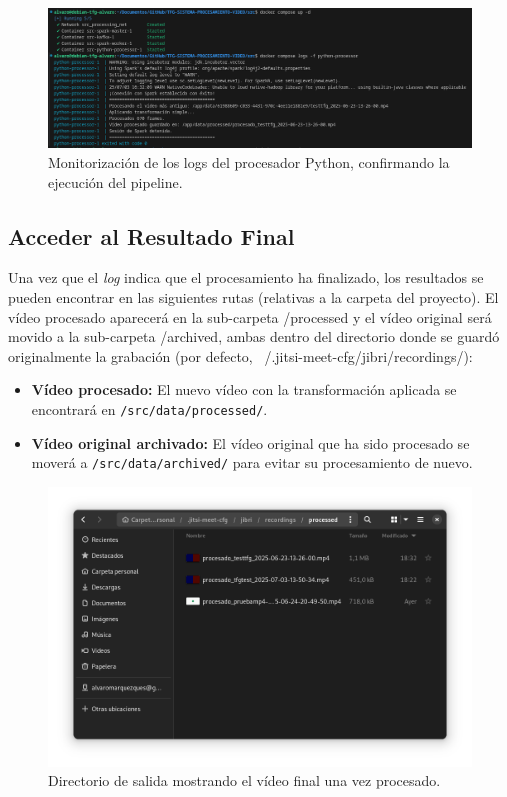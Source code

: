 \begin{figure}[H]
    \centering
    \includegraphics[width=\textwidth]{img/logsfinalpy.png}
    \caption{Monitorización de los logs del procesador Python, confirmando la ejecución del pipeline.}
    \label{fig:manual_logs_procesador}
\end{figure}

\subsection{Acceder al Resultado Final}
Una vez que el \textit{log} indica que el procesamiento ha finalizado, los resultados se pueden encontrar en las siguientes rutas (relativas a la carpeta del proyecto). El vídeo procesado aparecerá en la sub-carpeta /processed y el vídeo original será movido a la sub-carpeta /archived, ambas dentro del directorio donde se guardó originalmente la grabación (por defecto, ~/.jitsi-meet-cfg/jibri/recordings/):
\begin{itemize}
    \item \textbf{Vídeo procesado:} El nuevo vídeo con la transformación aplicada se encontrará en \texttt{/src/data/processed/}.
    \item \textbf{Vídeo original archivado:} El vídeo original que ha sido procesado se moverá a \texttt{/src/data/archived/} para evitar su procesamiento de nuevo.
\end{itemize}

\begin{figure}[H]
    \centering
    \includegraphics[width=\textwidth]{img/carpetaprocessed.png}
    \caption{Directorio de salida mostrando el vídeo final una vez procesado.}
    \label{fig:manual_carpeta_procesado}
\end{figure}

